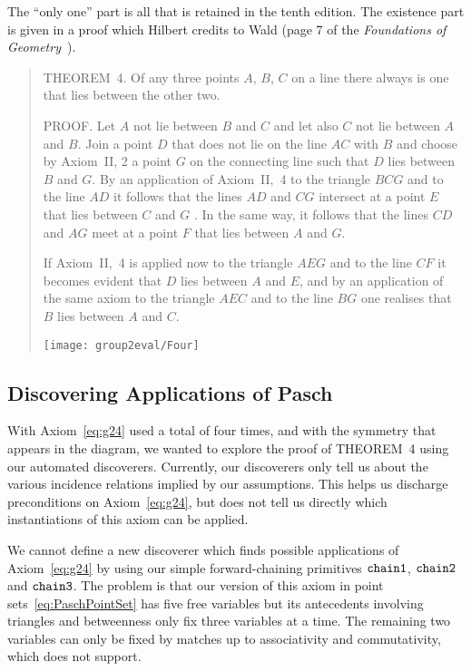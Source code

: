 The ``only one'' part is all that is retained in the tenth edition. The existence part is given in a proof which Hilbert credits to Wald (page 7 of the \emph{Foundations of Geometry}~\cite{FoundationsOfGeometry}).
\begin{quotation}
  THEOREM~4. Of any three points $A$, $B$, $C$ on a line there always is one that lies between the other two.

  PROOF. Let $A$ not lie between $B$ and $C$ and let also $C$ not lie between $A$ and $B$. Join a point $D$ that does not lie on the line $AC$ with $B$ and choose by Axiom~II, 2 a point $G$ on the connecting line such that $D$ lies between $B$ and $G$. By an application of Axiom~II,~4 to the triangle $BCG$ and to the line $AD$ it follows that the lines $AD$ and $CG$ intersect at a point $E$ that lies between $C$ and $G$ . In the same way, it follows that the lines $CD$ and $AG$ meet at a point $F$ that lies between $A$ and $G$.

If Axiom~II,~4 is applied now to the triangle $AEG$ and to the line $CF$ it becomes evident that $D$ lies between $A$ and $E$, and by an application of the same axiom to the triangle $AEC$ and to the line $BG$ one realises that $B$ lies between $A$ and $C$.

\centering \texttt{[image: group2eval/Four]}
\end{quotation}

\subsection{Discovering Applications of Pasch}\label{sec:PaschDiscoverer}
With Axiom~\ref{eq:g24} used a total of four times, and with the symmetry that appears in the diagram, we wanted to explore the proof of THEOREM~4 using our automated discoverers. Currently, our discoverers only tell us about the various incidence relations implied by our assumptions. This helps us discharge preconditions on Axiom~\ref{eq:g24}, but does not tell us directly which instantiations of this axiom can be applied.

We cannot define a new discoverer which finds possible applications of Axiom~\ref{eq:g24} by using our simple forward-chaining primitives $\texttt{chain1}$, $\texttt{chain2}$ and $\texttt{chain3}$. The problem is that our version of this axiom in point sets~\eqref{eq:PaschPointSet} has five free variables but its antecedents involving triangles and betweenness only fix three variables at a time. The remaining two variables can only be fixed by matches up to associativity and commutativity, which  does not support.

